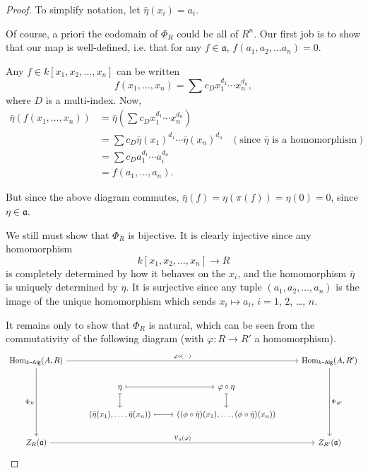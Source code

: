 \documentclass[a4paper,10pt]{scrreprt}
\newcommand{\Hom}{\mathrm{Hom}}
\def\mhyp{{\hbox{-}}}
\theoremstyle{definition}
\theoremstyle{plain}
\theoremstyle{remark}
\begin{document}
\begin{proof}
  To simplify notation, let $\bar{\eta}(x_{i}) = a_{i}$.

  Of course, a priori the codomain of $\Phi_{R}$ could be all of $R^{n}$. Our first job is to show that our map is well-defined, i.e. that for any $f \in \mathfrak{a}$, $f(a_{1}, a_{2}, \ldots a_{n}) = 0$.

  Any $f \in k[x_{1}, x_{2}, \ldots, x_{n}]$ can be written
  \begin{equation*}
    f(x_{1}, \ldots, x_{n}) = \sum c_{D} x_{1}^{d_{1}}\cdots x_{n}^{d_{n}},
  \end{equation*}
  where $D$ is a multi-index. Now,
  \begin{align*}
    \bar{\eta}(f(x_{1}, \ldots, x_{n})) &= \bar{\eta}\left( \sum c_{D} x_{1}^{d_{1}}\cdots x_{n}^{d_{n}} \right) \\
    &= \sum c_{D} \bar{\eta}(x_{1})^{d_{1}}\cdots \bar{\eta}(x_{n})^{d_{n}} &\left( \text{since $\bar{\eta}$ is a homomorphism} \right) \\
    &= \sum c_{D} a_{1}^{d_{1}}\cdots a_{i}^{d_{n}} \\
    &= f(a_{1}, \ldots, a_{n}).
  \end{align*}

  But since the above diagram commutes, $\bar{\eta}(f) = \eta(\pi(f)) = \eta(0) = 0$, since $\eta \in \mathfrak{a}$.

  We still must show that $\Phi_{R}$ is bijective. It is clearly injective since any homomorphism 
  \begin{equation*}
    k[x_{1}, x_{2}, \ldots, x_{n}] \to R
  \end{equation*}
  is completely determined by how it behaves on the $x_{i}$, and the homomorphism $\bar{\eta}$ is uniquely determined by $\eta$. It is surjective since any tuple $(a_{1}, a_{2}, \ldots, a_{n})$ is the image of the unique homomorphism which sends $x_{i} \mapsto a_{i}$, $i = 1$, $2$, \dots, $n$.

  It remains only to show that $\Phi_{R}$ is natural, which can be seen from the commutativity of the following diagram (with $\varphi\colon R \to R'$ a homomorphism).
  \begin{equation*}
    \begin{tikzcd}
      \Hom_{k\mhyp\mathsf{Alg}}(A, R)
      \arrow[rrr, "\varphi \circ (-)"]
      \arrow[ddd, swap, "\Phi_{R}"]
      & & & \Hom_{k\mhyp\mathsf{Alg}}(A, R')
      \arrow[ddd, "\Phi_{R'}"]
      \\
      & \eta
      \arrow[r, mapsto]
      \arrow[d, mapsto]
      & \varphi \circ \eta
      \arrow[d, mapsto]
      \\
      & (\bar{\eta}(x_1), \ldots, \bar{\eta}(x_{n}))
      \arrow[r, mapsto]
      & ((\phi \circ \bar{\eta})(x_1), \ldots, (\phi \circ \bar{\eta})(x_{n}))
      \\
      Z_{R}(\mathfrak{a})
      \arrow[rrr, "\mathcal{V}_{\mathfrak{a}}(\varphi)"]
      & & & Z_{R'}(\mathfrak{a})
    \end{tikzcd}
  \end{equation*}
\end{proof}
\end{document}
